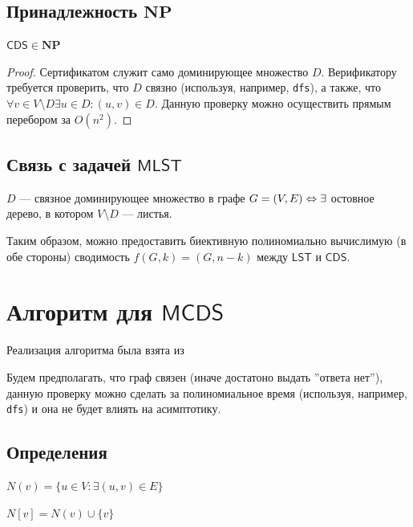 \subsection{Принадлежность \(\mathbf{NP}\)}

\begin{proposition}
    \(\mathsf{CDS} \in \mathbf{NP}\)
\end{proposition}
\begin{proof}
    Сертификатом служит само доминирующее множество \(D\). Верификатору требуется проверить, что \(D\) связно (используя, например, \texttt{dfs}), а также, что \(\forall v \in V \setminus D \exists u \in D: (u, v) \in D\). Данную проверку можно осуществить прямым перебором за \(O(n^2)\).
\end{proof}

\subsection{Связь с задачей \(\mathsf{MLST}\)}

\begin{note}
    \(D\) --- связное доминирующее множество в графе \(G = (V, E) \Leftrightarrow \exists\) остовное дерево, в котором \(V \setminus D\) --- листья.
\end{note}

Таким образом, можно предоставить биективную полиномиально вычислимую (в обе стороны) сводимость \(f(G, k) = (G, n - k)\) между \(\mathsf{LST}\) и \(\mathsf{CDS}\).

\section{Алгоритм для \(\mathsf{MCDS}\)}

Реализация алгоритма была взята из \cite{fomin}

Будем предполагать, что граф связен (иначе достатоно выдать ''ответа нет''), данную проверку можно сделать за полиномиальное время (используя, например, \texttt{dfs}) и она не будет влиять на асимптотику.

\subsection{Определения}

\begin{definition}
    \(N(v) = \{u \in V: \exists (u, v) \in E\}\)
\end{definition}

\begin{definition}
    \(N[v] = N(v) \cup \{v\}\)
\end{definition}

